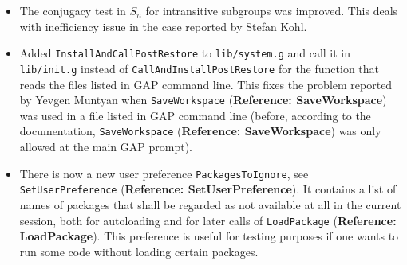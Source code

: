 \documentclass[a4paper,11pt]{report}
\begin{document}
{{\begin{itemize}
\item  The conjugacy test in $S_n$ for intransitive subgroups was improved. This deals with inefficiency issue in
the case reported by Stefan Kohl. 
\item  Added \texttt{InstallAndCallPostRestore} to \texttt{lib/system.g} and call it in \texttt{lib/init.g} instead of \texttt{CallAndInstallPostRestore} for the function that reads the files listed in \textsf{GAP} command line. This fixes the problem reported by Yevgen Muntyan when \texttt{SaveWorkspace} (\textbf{Reference: SaveWorkspace}) was used in a file listed in \textsf{GAP} command line (before, according to the documentation, \texttt{SaveWorkspace} (\textbf{Reference: SaveWorkspace}) was only allowed at the main \textsf{GAP} prompt). 
\item  There is now a new user preference \texttt{PackagesToIgnore}, see \texttt{SetUserPreference} (\textbf{Reference: SetUserPreference}). It contains a list of names of packages that shall be regarded as not
available at all in the current session, both for autoloading and for later
calls of \texttt{LoadPackage} (\textbf{Reference: LoadPackage}). This preference is useful for testing purposes if one wants to run some code
without loading certain packages. 
\end{itemize}
 }

 
}
\end{document}
